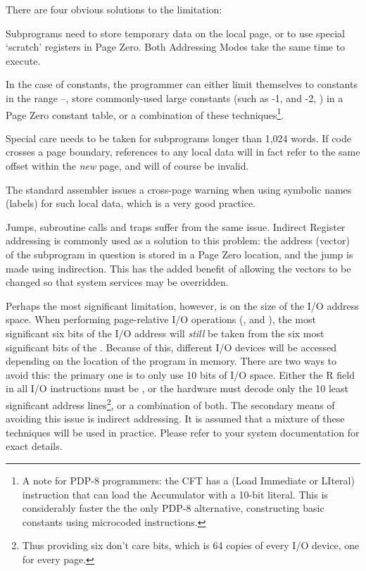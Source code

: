 There are four obvious solutions to the limitation:

Subprograms need to store temporary data on the local page, or to use
special ‘scratch’ registers in Page Zero. Both \glspl{Addressing Mode}
take the same time to execute.

In the case of constants, the programmer can either limit themselves
to constants in the range –, store commonly-used
large constants (such as -1,  and -2, ) in a Page
Zero constant table, or a combination of these techniques\footnote{A
  note for PDP-8 programmers: the CFT has a  (Load Immediate
  or LIteral) instruction that can load the \gls{Accumulator} with a 10-bit
  literal. This is considerably faster the the only PDP-8 alternative,
  constructing basic constants using microcoded instructions.}.

Special care needs to be taken for subprograms longer than 1,024
words. If code crosses a page boundary, references to any local data
will in fact refer to the same offset within the {\em new\/} page, and
will of course be invalid.

The standard assembler issues a cross-page warning when using symbolic
names (labels) for such local data, which is a very good practice.

Jumps, subroutine calls and traps suffer from the same issue. Indirect
Register addressing is commonly used as a solution to this problem:
the address (vector) of the subprogram in question is stored in a Page
Zero location, and the jump is made using indirection. This has the
added benefit of allowing the vectors to be changed so that system
services may be overridden.

Perhaps the most significant limitation, however, is on the size of the I/O
address space. When performing page-relative I/O operations (,
 and ), the most significant six bits of the I/O
address will {\em still\/} be taken from the six most significant bits of
the \PC. Because of this, different I/O devices will be accessed depending on
the location of the program in memory. There are two ways to avoid this: the
primary one is to only use 10 bits of I/O space. Either the R field in all I/O
instructions must be , or the hardware must decode only the 10 least
significant address lines\footnote{Thus providing six don't care bits, which is
64 copies of every I/O device, one for every page.}, or a combination of
both. The secondary means of avoiding this issue is indirect addressing. It is
assumed that a mixture of these techniques will be used in practice. Please
refer to your system documentation for exact details.

